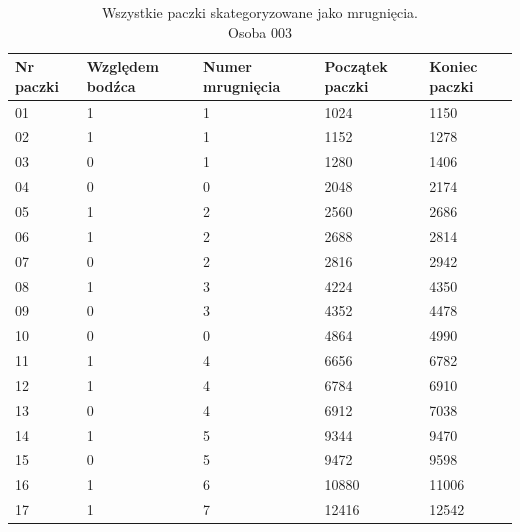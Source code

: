 \documentclass{article}
\begin{document}
        \begin{table}[H]
            \captionsetup{justification=centering}
            \caption {Wszystkie paczki skategoryzowane jako mrugnięcia. \\ Osoba 003}
            \begin{center}
                \begin{tabular}{| p{1cm} | p{1.75cm} | p{1.75cm} | p{1.75cm} | p{1.75cm} |}
                    \hline
                    Nr paczki & Względem bodźca & Numer mrugnięcia & Początek paczki & Koniec paczki \\
                    \hline
                    \hline
                    01 & 1 & 1 & 1024 & 1150 \\
                    \hline
                    02 & 1 & 1 & 1152 & 1278 \\
                    \hline
                    03 & 0 & 1 & 1280 & 1406 \\
                    \hline
                    04 & 0 & 0 & 2048 & 2174 \\
                    \hline
                    05 & 1 & 2 & 2560 & 2686 \\
                    \hline
                    06 & 1 & 2 & 2688 & 2814 \\
                    \hline
                    07 & 0 & 2 & 2816 & 2942 \\
                    \hline
                    08 & 1 & 3 & 4224 & 4350 \\
                    \hline
                    09 & 0 & 3 & 4352 & 4478 \\
                    \hline
                    10 & 0 & 0 & 4864 & 4990 \\
                    \hline
                    11 & 1 & 4 & 6656 & 6782 \\
                    \hline
                    12 & 1 & 4 & 6784 & 6910 \\
                    \hline
                    13 & 0 & 4 & 6912 & 7038 \\
                    \hline
                    14 & 1 & 5 & 9344 & 9470 \\
                    \hline
                    15 & 0 & 5 & 9472 & 9598 \\
                    \hline
                    16 & 1 & 6 & 10880 & 11006 \\
                    \hline
                    17 & 1 & 7 & 12416 & 12542 \\
                    \hline

\end{tabular}
\end{center}
\end{table}
\end{document}
